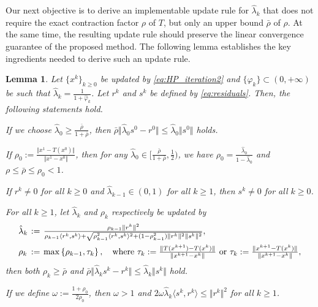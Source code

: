 \documentclass{article}
\theoremstyle{plain}
\newtheorem{lemma}{Lemma}[section]
\theoremstyle{definition}
\newcommand{\set}[1]{\left\{#1\right\}}
\newcommand{\sets}[1]{\{#1\}}
\newcommand{\norms}[1]{\Vert#1\Vert}
\newcommand{\iprods}[1]{\langle #1\rangle}
\newcommand{\0}{\boldsymbol{0}}
\begin{document}
Our next objective is to derive an implementable update rule for $\hat{\lambda}_k$ that does not require the exact contraction factor $\rho$ of $T$, but only an upper bound $\bar{\rho}$ of $\rho$. 
At the same time, the resulting update rule should preserve the linear convergence guarantee of the proposed method. 
The following lemma establishes the key ingredients needed to derive such an update rule.

\begin{lemma}\label{le:implementable_step}
Let $\sets{x^k}_{k \geq 0}$ be updated by \eqref{eq:HP_iteration2} and $\sets{\hat{\varphi}_k} \subset (0, +\infty)$ be such that $\hat{\lambda}_k = \frac{1}{1 + \hat{\varphi}_k}$.
Let $r^k$ and $s^k$ be defined by \eqref{eq:residuals}.
Then, the following statements hold.
\begin{compactitem}
\item[$\mathrm{(i)}$]
If we choose $\hat{\lambda}_0 \geq \frac{\bar{\rho}}{1 + \bar{\rho}}$, then $\bar{\rho} \norms{\hat{\lambda}_0s^0 - r^0}  \leq \hat{\lambda}_0\norms{s^0}$ holds.

\item[$\mathrm{(ii)}$]
If $\rho_0 :=  \frac{\norms{x^1 - T(x^0)}}{\norms{x^1 - x^0}}$, then for any $\hat{\lambda}_0 \in \big[\frac{ \bar{\rho}}{1 + \bar{\rho}}, \frac{1}{2} \big)$, we have $\rho_0 = \frac{\hat{\lambda}_0}{1-\hat{\lambda}_0}$ and $\rho \leq \bar{\rho} \leq \rho_0 < 1$.

\item[$\mathrm{(iii)}$] If $r^k \neq 0$ for all $k \geq 0$ and $\hat{\lambda}_{k-1} \in (0, 1)$ for all $k \geq 1$, then $s^k \neq 0$ for all $k \geq 0$.

\item[$\mathrm{(iv)}$] For all $k \geq 1$, let $\hat{\lambda}_k$ and $\rho_k$ respectively be updated by
\begin{equation}\label{eq:lambda_k_update}
\arraycolsep=0.2em
\begin{array}{lcl}
\hat{\lambda}_k & := & \frac{\rho_{k-1}\norms{r^k}^2 }{ \rho_{k-1} \iprods{r^k, s^k} + \sqrt{\rho_{k-1}^2\iprods{r^k, s^k}^2 + (1 - \rho_{k-1}^2 )\norms{r^k}^2\norms{s^k}^2} }, \vspace{1ex}\\
\rho_k  & := & \max\set{\rho_{k-1}, \tau_k}, \quad \textrm{where} \  \tau_k := \frac{\norms{T(x^{k+1}) - T(x^k)}}{\norms{x^{k+1} - x^k}} \ \textrm{or} \ \tau_k := \frac{\norms{x^{k+1} - T(x^k)}}{\norms{x^{k+1} - x^k}},
\end{array}
\end{equation}	
then both $\rho_k \geq \bar{\rho}$ and $\bar{\rho} \norms{\hat{\lambda}_ks^k - r^k}  \leq \hat{\lambda}_k\norms{s^k}$ hold.

\item[$\mathrm{(v)}$]
If we define $\omega := \frac{1 + \rho_0}{2\rho_0}$, then $\omega > 1$ and $2\omega\hat{\lambda}_k\iprods{s^k, r^k} \leq \norms{r^k}^2$ for all $k \geq 1$.
\end{compactitem}
\end{lemma}
\end{document}
